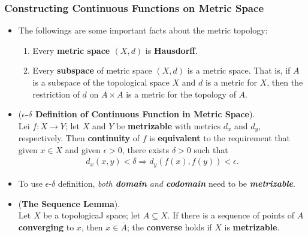 \documentclass[11pt]{article}
\begin{document}
\subsubsection{Constructing Continuous Functions on Metric Space}
\begin{itemize}
\item The followings are some important facts about the metric topology:
\begin{enumerate}
\item \begin{proposition}
Every \textbf{metric space $(X, d)$} is \textbf{Hausdorff}.
\end{proposition}

\item \begin{proposition}
Every \textbf{subspace} of metric space $(X, d)$ is a metric space. That is, if $A$ is a subspace of the topological space $X$ and $d$ is a metric for $X$, then the restriction of $d$ on $A \times A$ is a metric for the topology of  $A$.
\end{proposition}
\end{enumerate}

\item \begin{theorem} (\textbf{$\epsilon$-$\delta$ Definition of Continuous Function in Metric Space}). \citep{munkres2000topology} \\
Lei $f: X \rightarrow Y$; let $X$ and $Y$ be \textbf{metrizable} with metrics $d_x$ and $d_y$, respectively. Then \textbf{continuity} of $f$ is \textbf{equivalent} to the requirement that given $x \in X$ and given $\epsilon > 0$, there exists $\delta > 0$ such that
\begin{align*}
d_x(x, y) < \delta \Rightarrow d_{y}(f(x), f(y)) < \epsilon.
\end{align*}
\end{theorem}

\item \begin{remark}
To use $\epsilon$-$\delta$ definition, \emph{both \textbf{domain} and \textbf{codomain}} need to be \emph{\textbf{metrizable}}.
\end{remark}

\item \begin{lemma}(\textbf{The Sequence Lemma}). \citep{munkres2000topology}\\
Let $X$ be a topologicaJ space; let $A \subseteq X$. If there is a sequence of points of $A$ \textbf{converging} to $x$, then $x \in \bar{A}$; the \textbf{converse} holds if $X$ is \textbf{metrizable}.
\end{lemma}


\end{itemize}
\end{document}
